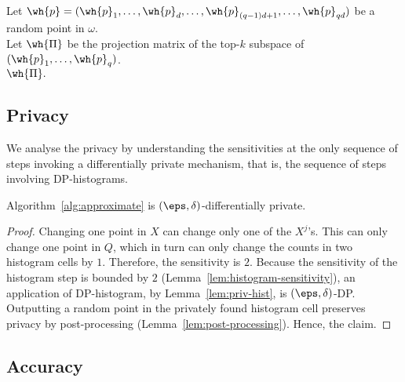 \begin{algorithm}[h!]
Let $\wh{p}=(\wh{p}_1,\dots,\wh{p}_d,\dots,\wh{p}_{(q-1)d+1},\dots,\wh{p}_{qd})$
    be a random point in $\omega$.\\
    Let $\wh{\Pi}$ be the projection matrix of the top-$k$ subspace of $(\wh{p}_1,\dots,\wh{p}_q)$.\\
\Return $\wh{\Pi}.$
\vspace{5pt}
\end{algorithm}

\subsection{Privacy}

We analyse the privacy by understanding the sensitivities
at the only sequence of steps invoking a differentially
private mechanism, that is, the sequence of steps involving
DP-histograms.

\begin{lemma}\label{lem:histogram-sensitivity}\label{coro:privacy}
    Algorithm~\ref{alg:approximate} is $(\eps,\delta)$-differentially
    private.
\end{lemma}
\begin{proof}
    Changing one point in $X$ can change only
    one of the $X^j$'s. This can
    only change one point in $Q$, which in turn can only
    change the counts in two histogram cells by $1$.
    Therefore, the sensitivity is $2$. %
    Because the sensitivity of the histogram step is bounded
    by $2$ (Lemma~\ref{lem:histogram-sensitivity}), an application
    of DP-histogram, by Lemma~\ref{lem:priv-hist}, is $(\eps,\delta)$-DP.
    Outputting a random
    point in the privately found histogram cell preserves privacy
    by post-processing (Lemma~\ref{lem:post-processing}).
    Hence, the claim.
\end{proof}

\subsection{Accuracy}

